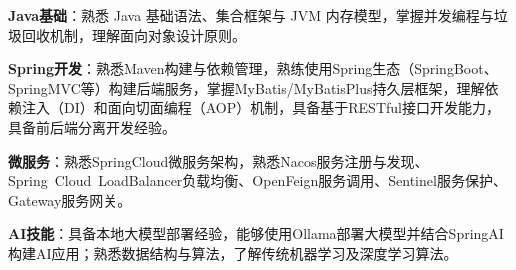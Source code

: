 \item \textbf{Java基础}：熟悉 Java 基础语法、集合框架与 JVM 内存模型，掌握并发编程与垃圾回收机制，理解面向对象设计原则。
\item \textbf{Spring开发}：熟悉Maven构建与依赖管理，熟练使用Spring生态（SpringBoot、SpringMVC等）构建后端服务，掌握MyBatis/MyBatisPlus持久层框架，理解依赖注入（DI）和面向切面编程（AOP）机制，具备基于RESTful接口开发能力，具备前后端分离开发经验。
\item \textbf{微服务}：熟悉SpringCloud微服务架构，熟悉Nacos服务注册与发现、Spring Cloud LoadBalancer负载均衡、OpenFeign服务调用、Sentinel服务保护、Gateway服务网关。
\item \textbf{AI技能}：具备本地大模型部署经验，能够使用Ollama部署大模型并结合SpringAI构建AI应用；熟悉数据结构与算法，了解传统机器学习及深度学习算法。